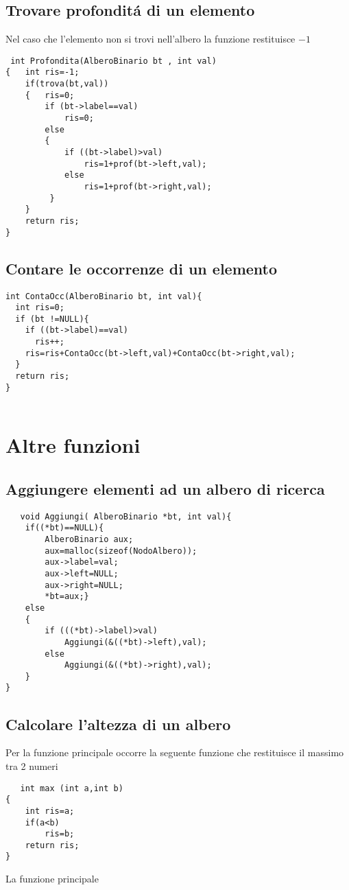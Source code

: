 \documentclass[a4paper,12pt,openany]{book}
\begin{document}
 \section{Trovare profondit\'a di un elemento}
  Nel caso che l'elemento non si trovi nell'albero la funzione restituisce $-1$
   \begin{lstlisting}
 int Profondita(AlberoBinario bt , int val)
{   int ris=-1;
    if(trova(bt,val))
    {   ris=0;
        if (bt->label==val)
            ris=0;
        else
        {
            if ((bt->label)>val)
                ris=1+prof(bt->left,val);
            else
                ris=1+prof(bt->right,val);
         }
    }
    return ris;
}  
 \end{lstlisting}

  \section{Contare le occorrenze di un elemento}
   \begin{lstlisting}
int ContaOcc(AlberoBinario bt, int val){
  int ris=0;
  if (bt !=NULL){
    if ((bt->label)==val)
      ris++;
    ris=ris+ContaOcc(bt->left,val)+ContaOcc(bt->right,val);
  }
  return ris;
}
	 
 \end{lstlisting}
\chapter{Altre funzioni}
  \section{Aggiungere elementi ad un albero di ricerca}
   \begin{lstlisting}
   void Aggiungi( AlberoBinario *bt, int val){
    if((*bt)==NULL){
        AlberoBinario aux;
        aux=malloc(sizeof(NodoAlbero));
        aux->label=val;
        aux->left=NULL;
        aux->right=NULL;
        *bt=aux;}
    else
    {
        if (((*bt)->label)>val)
            Aggiungi(&((*bt)->left),val);
        else
            Aggiungi(&((*bt)->right),val);
    }
}
 \end{lstlisting}

\newpage
  \section{Calcolare l'altezza di un albero }
  Per la funzione principale occorre la seguente funzione che restituisce il massimo tra 2 numeri
   \begin{lstlisting}
   int max (int a,int b)
{
    int ris=a;
    if(a<b)
        ris=b;
    return ris;
}
 \end{lstlisting}
 La funzione principale
 
\end{document}
